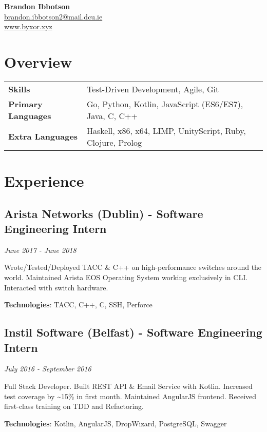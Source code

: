 \documentclass{article}
\newcommand{\youremail}[1]{\href{mailto:#1}{#1}}
\newcommand{\yourtitle}[3]{
  \begin{center}
    {\huge\bfseries #1}\\
    \vspace{.5em}
    \youremail{#2}\\
    \url{#3}\\
    \vspace{.7em}
  \end{center}
}
\begin{document}
\yourtitle{Brandon Ibbotson}{brandon.ibbotson2@mail.dcu.ie}{www.byxor.xyz}
\section{Overview}
\begin{tabularx}{\textwidth}{ll}
\vspace{0.75em}
\textbf{Skills} & Test-Driven Development, Agile, Git\\
\vspace{0.75em}
\textbf{Primary Languages} & Go, Python, Kotlin, JavaScript (ES6/ES7), Java, C, C++\\
\textbf{Extra Languages} & Haskell, x86, x64, LIMP, UnityScript, Ruby, Clojure, Prolog\\
\end{tabularx}
\section{Experience}
\subsection{Arista Networks (Dublin) - Software Engineering Intern}
\textit{June 2017 - June 2018}

Wrote/Tested/Deployed TACC \& C++ on high-performance switches around the world. Maintained Arista EOS Operating System working exclusively in CLI. Interacted with switch hardware.

\textbf{Technologies}: TACC, C++, C, SSH, Perforce
\vspace{0.5em}
\subsection{Instil Software (Belfast) - Software Engineering Intern}
\textit{July 2016 - September 2016}

Full Stack Developer. Built REST API \& Email Service with Kotlin. Increased test coverage by \textasciitilde{}15\% in first month. Maintained AngularJS frontend. Received first-class training on TDD and Refactoring.

\textbf{Technologies}: Kotlin, AngularJS, DropWizard, PostgreSQL, Swagger
\vspace{0.5em}
\end{document}
